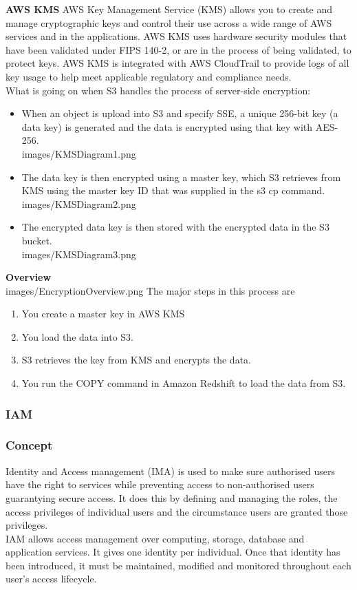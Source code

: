 \documentclass[10pt]{article}
\begin{document}
\textbf{AWS KMS}
AWS Key Management Service (KMS) allows you to create and manage cryptographic keys and control their use across a wide range of AWS services and in the applications. AWS KMS uses hardware security modules that have been validated under FIPS 140-2, or are in the process of being validated, to protect keys. AWS KMS is integrated with AWS CloudTrail to provide logs of all key usage to help meet applicable regulatory and compliance needs.
\\
What is going on when S3 handles the process of server-side encryption:
\begin{itemize}
    \item When an object is upload into S3 and specify SSE, a unique 256-bit key (a data key) is generated and the data is encrypted using that key with AES-256.
    \\{images/KMSDiagram1.png}\\
    \item The data key is then encrypted using a master key, which S3 retrieves from KMS using the master key ID that was supplied in the s3 cp command.
    \\{images/KMSDiagram2.png}\\
    \item The encrypted data key is then stored with the encrypted data in the S3 bucket.
    \\{images/KMSDiagram3.png}\\
\end{itemize}
\textbf{Overview} 
\\{images/EncryptionOverview.png}
The major steps in this process are
\begin{enumerate}
  \item You create a master key in AWS KMS
  \item You load the data into S3.
  \item S3 retrieves the key from KMS and encrypts the data.
  \item You run the COPY command in Amazon Redshift to load the data from S3.
\end{enumerate}
\subsubsection{IAM}
\subsubsection{Concept}
Identity and Access management (IMA) is used to make sure authorised users have the right to services while preventing access to non-authorised users guarantying secure access. It does this by defining and managing the roles, the access privileges of individual users and the circumstance users are granted those privileges.
\\
IAM allows access management over computing, storage, database and application services. It gives one identity per individual. Once that identity has been introduced, it must be maintained, modified and monitored throughout each user’s access lifecycle.
\end{document}
